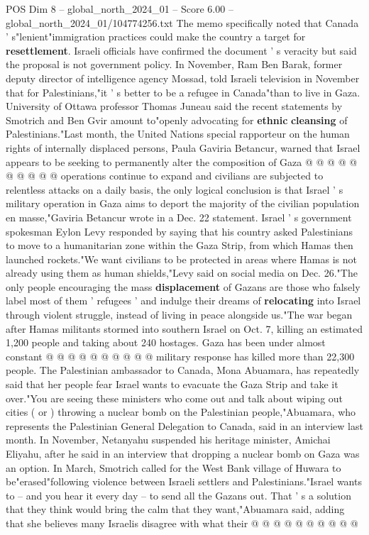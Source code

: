 \begin{textsample}{POS Dim 8 – global\_north\_2024\_01 – Score 6.00 – global\_north\_2024\_01/104774256.txt}
The memo specifically noted that Canada ' s"lenient"immigration practices could make the country a target for \textbf{resettlement}.
Israeli officials have confirmed the document ' s veracity but said the proposal is not government policy.
In November, Ram Ben Barak, former deputy director of intelligence agency Mossad, told Israeli television in November that for Palestinians,"it ' s better to be a refugee in Canada"than to live in Gaza.
University of Ottawa professor Thomas Juneau said the recent statements by Smotrich and Ben Gvir amount to"openly advocating for \textbf{ethnic} \textbf{cleansing} of Palestinians."Last month, the United Nations special rapporteur on the human rights of internally displaced persons, Paula Gaviria Betancur, warned that Israel appears to be seeking to permanently alter the composition of Gaza @ @ @ @ @ @ @ @ @ @ operations continue to expand and civilians are subjected to relentless attacks on a daily basis, the only logical conclusion is that Israel ' s military operation in Gaza aims to deport the majority of the civilian population en masse,"Gaviria Betancur wrote in a Dec. 22 statement.
Israel ' s government spokesman Eylon Levy responded by saying that his country asked Palestinians to move to a humanitarian zone within the Gaza Strip, from which Hamas then launched rockets."We want civilians to be protected in areas where Hamas is not already using them as human shields,"Levy said on social media on Dec. 26."The only people encouraging the mass \textbf{displacement} of Gazans are those who falsely label most of them ' refugees ' and indulge their dreams of \textbf{relocating} into Israel through violent struggle, instead of living in peace alongside us."The war began after Hamas militants stormed into southern Israel on Oct. 7, killing an estimated 1,200 people and taking about 240 hostages.
Gaza has been under almost constant @ @ @ @ @ @ @ @ @ @ military response has killed more than 22,300 people.
The Palestinian ambassador to Canada, Mona Abuamara, has repeatedly said that her people fear Israel wants to evacuate the Gaza Strip and take it over."You are seeing these ministers who come out and talk about wiping out cities ( or ) throwing a nuclear bomb on the Palestinian people,"Abuamara, who represents the Palestinian General Delegation to Canada, said in an interview last month.
In November, Netanyahu suspended his heritage minister, Amichai Eliyahu, after he said in an interview that dropping a nuclear bomb on Gaza was an option.
In March, Smotrich called for the West Bank village of Huwara to be"erased"following violence between Israeli settlers and Palestinians."Israel wants to -- and you hear it every day -- to send all the Gazans out.
That ' s a solution that they think would bring the calm that they want,"Abuamara said, adding that she believes many Israelis disagree with what their @ @ @ @ @ @ @ @ @ @

\end{textsample}
